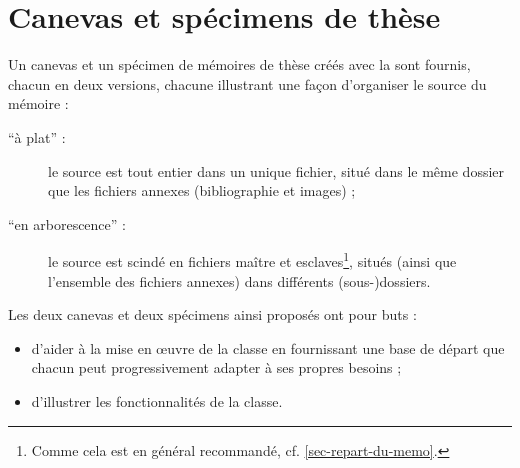 \chapter{Canevas et spécimens de thèse}\label{cha-specimen-canevas}%
%
%

Un canevas et un spécimen de mémoires de thèse créés avec la \yatCl sont
fournis, chacun en deux versions, chacune illustrant une façon d'organiser le
source  du mémoire :
\begin{description}
\item[\enquote{à plat} :] le source est tout entier dans un unique fichier,
  situé dans le même dossier que les fichiers annexes (bibliographie et
  images) ;
\item[\enquote{en arborescence} :]%
  le source est scindé en fichiers maître et esclaves\footnote{Comme cela est en
    général recommandé, cf. \vref{sec-repart-du-memo}.}, situés (ainsi que
  l'ensemble des fichiers annexes) dans différents (sous-)dossiers.
\end{description}
Les deux canevas et deux spécimens ainsi proposés ont pour buts :
\begin{itemize}
\item d'aider à la mise en œuvre de la classe en fournissant une base de départ
  que chacun peut progressivement adapter à ses propres
  besoins ;
\item d'illustrer les fonctionnalités de la classe.
\end{itemize}

